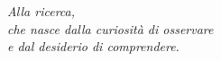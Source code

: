 \cleardoublepage
\thispagestyle{empty}

\vspace*{3cm}

\begin{raggedleft}
    \itshape
    Alla ricerca,\\
    che nasce dalla curiosità di osservare\\
    e dal desiderio di comprendere.\\
\end{raggedleft}

\vspace{4cm}
